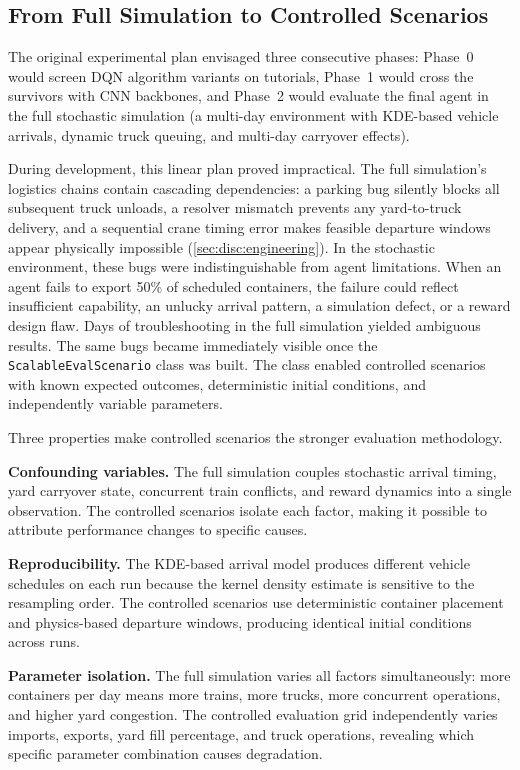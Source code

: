 \subsection{From Full Simulation to Controlled Scenarios}
\label{sec:exp:phase2:rationale}

The original experimental plan envisaged three consecutive phases: Phase~0 would screen DQN algorithm variants on tutorials, Phase~1 would cross the survivors with CNN backbones, and Phase~2 would evaluate the final agent in the full stochastic simulation (a multi-day environment with KDE-based vehicle arrivals, dynamic truck queuing, and multi-day carryover effects).

During development, this linear plan proved impractical. The full simulation's logistics chains contain cascading dependencies: a parking bug silently blocks all subsequent truck unloads, a resolver mismatch prevents any yard-to-truck delivery, and a sequential crane timing error makes feasible departure windows appear physically impossible (\cref{sec:disc:engineering}). In the stochastic environment, these bugs were indistinguishable from agent limitations. When an agent fails to export 50\% of scheduled containers, the failure could reflect insufficient capability, an unlucky arrival pattern, a simulation defect, or a reward design flaw. Days of troubleshooting in the full simulation yielded ambiguous results. The same bugs became immediately visible once the \texttt{ScalableEvalScenario} class was built. The class enabled controlled scenarios with known expected outcomes, deterministic initial conditions, and independently variable parameters.

Three properties make controlled scenarios the stronger evaluation methodology.

\textbf{Confounding variables.} The full simulation couples stochastic arrival timing, yard carryover state, concurrent train conflicts, and reward dynamics into a single observation. The controlled scenarios isolate each factor, making it possible to attribute performance changes to specific causes.

\textbf{Reproducibility.} The KDE-based arrival model produces different vehicle schedules on each run because the kernel density estimate is sensitive to the resampling order. The controlled scenarios use deterministic container placement and physics-based departure windows, producing identical initial conditions across runs.

\textbf{Parameter isolation.} The full simulation varies all factors simultaneously: more containers per day means more trains, more trucks, more concurrent operations, and higher yard congestion. The controlled evaluation grid independently varies imports, exports, yard fill percentage, and truck operations, revealing which specific parameter combination causes degradation.

